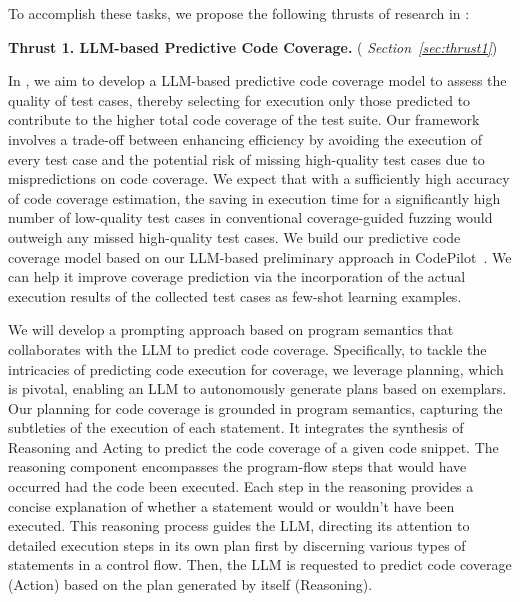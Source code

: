 
To accomplish these tasks, we propose the following thrusts of
research in {\tool}:

\noindent \textbf{Thrust 1. LLM-based Predictive Code Coverage.} ({\em
  Section~\ref{sec:thrust1}})

In {\tool}, we aim to develop a LLM-based predictive code coverage
model to assess the quality of test cases, thereby selecting for
execution only those predicted to contribute to the higher total code
coverage of the test suite. Our framework involves a trade-off between
enhancing efficiency by avoiding the execution of every test case and
the potential risk of missing high-quality test cases due to
mispredictions on code coverage. We expect that with a sufficiently
high accuracy of code coverage estimation, the saving in execution
time for a significantly high number of low-quality test cases in
conventional coverage-guided fuzzing would outweigh any missed
high-quality test cases. We build our predictive code coverage model
based on our LLM-based preliminary approach in
CodePilot~\cite{forge24}. We can help it improve coverage prediction
via the incorporation of the actual execution results of the
collected test cases as few-shot learning examples.

We will develop a prompting approach based on program semantics that
collaborates with the LLM to predict code coverage. Specifically, to
tackle the intricacies of predicting code execution for coverage, we
leverage planning, which is pivotal, enabling an LLM to
autonomously generate plans based on exemplars. Our planning for code
coverage is grounded in program semantics, capturing the subtleties of
the execution of each statement. It integrates the synthesis of
Reasoning and Acting to predict the code coverage of a given code
snippet. The reasoning component encompasses the program-flow steps
that would have occurred had the code been executed. Each step in the
reasoning provides a concise explanation of whether a statement would
or wouldn't have been executed. This reasoning process guides the LLM,
directing its attention to detailed execution steps in its own plan
first by discerning various types of statements in a control
flow. Then, the LLM is requested to predict code coverage (Action)
based on the plan generated by itself (Reasoning).


